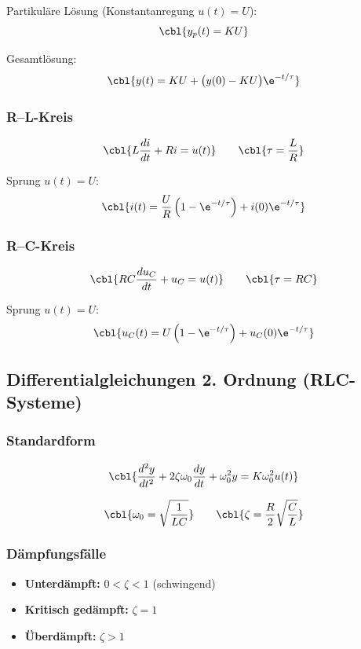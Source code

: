 Partikuläre Lösung (Konstantanregung $u(t)=U$):
\[
\cbl{y_p(t)=K U}
\]

Gesamtlösung:
\[
\cbl{y(t) = K U + \big(y(0)-K U\big)\e^{-t/\tau}}
\]

\subsubsection{R--L-Kreis}

\[
\cbl{L\frac{di}{dt} + Ri = u(t)}
\qquad
\cbl{\tau = \frac{L}{R}}
\]

Sprung $u(t)=U$:
\[
\cbl{i(t) = \frac{U}{R}\left(1-\e^{-t/\tau}\right) + i(0)\e^{-t/\tau}}
\]

\subsubsection{R--C-Kreis}

\[
\cbl{RC\frac{du_C}{dt} + u_C = u(t)}
\qquad
\cbl{\tau = RC}
\]

Sprung $u(t)=U$:
\[
\cbl{u_C(t) = U\left(1-\e^{-t/\tau}\right) + u_C(0)\e^{-t/\tau}}
\]


\subsection{Differentialgleichungen 2. Ordnung (RLC-Systeme)}

\subsubsection{Standardform}

\[
\cbl{\frac{d^2y}{dt^2} + 2\zeta\omega_0 \frac{dy}{dt} + \omega_0^2 y = K \omega_0^2 u(t)}
\]

\[
\cbl{\omega_0 = \sqrt{\frac{1}{LC}}}
\qquad
\cbl{\zeta = \frac{R}{2}\sqrt{\frac{C}{L}}}
\]

\subsubsection{Dämpfungsfälle}

\begin{itemize}
    \item \textbf{Unterdämpft:} $0<\zeta<1$ (schwingend)
    \item \textbf{Kritisch gedämpft:} $\zeta=1$
    \item \textbf{Überdämpft:} $\zeta>1$
\end{itemize}


